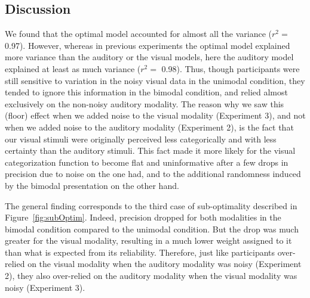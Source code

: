 \documentclass[english,,man,floatsintext]{apa6}
\theoremstyle{definition}
\theoremstyle{definition}
\theoremstyle{definition}
\theoremstyle{remark}
\begin{document}
\subsection{Discussion}\label{discussion-3}

We found that the optimal model accounted for almost all the variance
(\(r^2 =\) 0.97). However, whereas in previous experiments the optimal
model explained more variance than the auditory or the visual models,
here the auditory model explained at least as much variance (\(r^2 =\)
0.98). Thus, though participants were still sensitive to variation in
the noisy visual data in the unimodal condition, they tended to ignore
this information in the bimodal condition, and relied almost exclusively
on the non-noisy auditory modality. The reason why we saw this (floor)
effect when we added noise to the visual modality (Experiment 3), and
not when we added noise to the auditory modality (Experiment 2), is the
fact that our visual stimuli were originally perceived less
categorically and with less certainty than the auditory stimuli. This
fact made it more likely for the visual categorization function to
become flat and uninformative after a few drops in precision due to
noise on the one had, and to the additional randomness induced by the
bimodal presentation on the other hand.

The general finding corresponds to the third case of sub-optimality
described in Figure~\ref{fig:subOptim}. Indeed, precision dropped for
both modalities in the bimodal condition compared to the unimodal
condition. But the drop was much greater for the visual modality,
resulting in a much lower weight assigned to it than what is expected
from its reliability. Therefore, just like participants over-relied on
the visual modality when the auditory modality was noisy (Experiment 2),
they also over-relied on the auditory modality when the visual modality
was noisy (Experiment 3).
\end{document}
